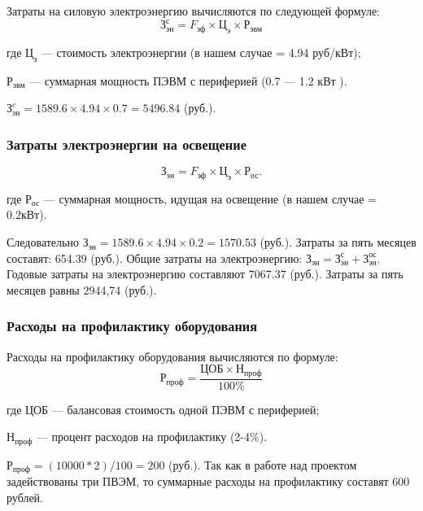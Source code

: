 \begin{par}
Затраты на силовую электроэнергию вычисляются по следующей формуле:
\begin{equation}
	\textrm{З}_\textrm{эн}^{с} = F_\textrm{эф} \times{} \textrm{Ц}_\textrm{э} \times{} \textrm{Р}_\textrm{эвм}
\end{equation}
\begin{ESKDexplanation}
	\item[где ]{} $\textrm{Ц}_\textrm{э}$ --- стоимость электроэнергии (в нашем случае = 4.94 руб/кВт);
	\item{} $\textrm{Р}_\textrm{эвм}$ --- суммарная мощность ПЭВМ с  периферией (0.7 --- 1.2 кВт ).
\end{ESKDexplanation}
$\textrm{З}_\textrm{эн}^c = 1589.6 \times{} 4.94 \times{} 0.7 = 5496.84$ (руб.).
\end{par}

\subsubsection{Затраты электроэнергии на освещение}
\begin{equation}
	\textrm{З}_\textrm{эн} = F_\textrm{эф} \times{} \textrm{Ц}_\textrm{э} \times{} \textrm{Р}_\textrm{ос}.
\end{equation}
\begin{ESKDexplanation}
	\item[где ]{} $\textrm{Р}_\textrm{ос}$ --- суммарная мощность, идущая на освещение (в нашем случае = 0.2кВт).
\end{ESKDexplanation}
Следовательно $\textrm{З}_\textrm{эн} = 1589.6 \times{} 4.94 \times{} 0.2 = 1570.53$ (руб.).
Затраты за пять месяцев составят: 654.39 (руб.).
Общие затраты на электроэнергию: $\textrm{З}_\textrm{эн} = \textrm{З}_\textrm{эн}^{с} + \textrm{З}_\textrm{эн}^{ос}$.
Годовые  затраты на электроэнергию  составляют 7067.37  (руб.). Затраты за пять месяцев равны 2944,74 (руб.).


\subsubsection{Расходы на профилактику оборудования}
Расходы на профилактику оборудования вычисляются по формуле:
\begin{equation}
	\textrm{Р}_\textrm{проф} = \frac{\textrm{ЦОБ} \times{} \textrm{Н}_\textrm{проф}}{100\%}
\end{equation}
\begin{ESKDexplanation}
	\item[где ]{} $\textrm{ЦОБ}$ --- балансовая стоимость одной ПЭВМ с периферией;
	\item{} $\textrm{Н}_\textrm{проф}$ --- процент расходов на профилактику (2-4\%).
\end{ESKDexplanation}
$\textrm{Р}_\textrm{проф} = (10000 * 2) / 100  = 200$ (руб.).
Так как в работе над проектом задействованы три ПВЭМ, то суммарные расходы на профилактику составят 600 рублей.

